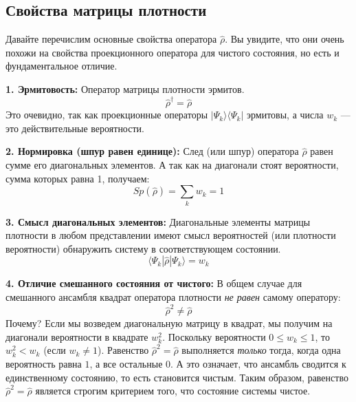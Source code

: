 \documentclass[../general/general]{subfiles}
\begin{document}
\subsection{Свойства матрицы плотности}

Давайте перечислим основные свойства оператора $\hat{\rho}$. Вы увидите, что они очень похожи на свойства проекционного оператора для чистого состояния, но есть и фундаментальное отличие.

\textbf{1. Эрмитовость:} 
Оператор матрицы плотности эрмитов. 
\begin{equation}
    \hat{\rho}^\dagger = \hat{\rho}
\end{equation}
Это очевидно, так как проекционные операторы $|\Psi_k\rangle \langle \Psi_k|$ эрмитовы, а числа $w_k$ — это действительные вероятности.

\textbf{2. Нормировка (шпур равен единице):}
След (или шпур) оператора $\hat{\rho}$ равен сумме его диагональных элементов. А так как на диагонали стоят вероятности, сумма которых равна 1, получаем:
\begin{equation}
    Sp(\hat{\rho}) = \sum_k w_k = 1
\end{equation}

\textbf{3. Смысл диагональных элементов:}
Диагональные элементы матрицы плотности в любом представлении имеют смысл вероятностей (или плотности вероятности) обнаружить систему в соответствующем состоянии. 
\begin{equation}
    \langle \Psi_k | \hat{\rho} | \Psi_k \rangle = w_k
\end{equation}

\textbf{4. Отличие смешанного состояния от чистого:}
В общем случае для смешанного ансамбля квадрат оператора плотности \textit{не равен} самому оператору:
\begin{equation}
    \hat{\rho}^2 \neq \hat{\rho}
\end{equation}
Почему? Если мы возведем диагональную матрицу в квадрат, мы получим на диагонали вероятности в квадрате $w_k^2$. Поскольку вероятности $0 \le w_k \le 1$, то $w_k^2 < w_k$ (если $w_k \neq 1$). Равенство $\hat{\rho}^2 = \hat{\rho}$ выполняется \textit{только} тогда, когда одна вероятность равна $1$, а все остальные $0$. А это означает, что ансамбль сводится к единственному состоянию, то есть становится чистым. Таким образом, равенство $\hat{\rho}^2 = \hat{\rho}$ является строгим критерием того, что состояние системы чистое. 
\end{document}

